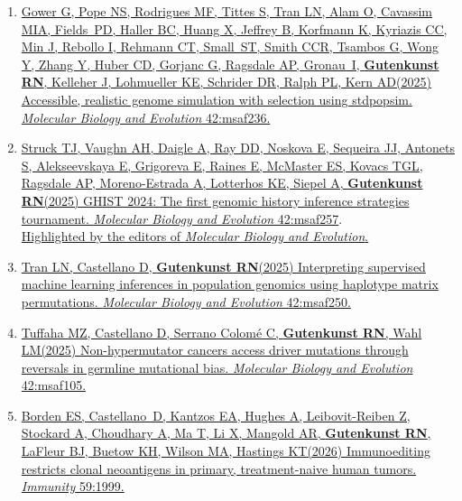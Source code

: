 \documentclass[11pt]{article}
\begin{document}
\begin{enumerate}
\item \href{https://doi.org/10.1093/molbev/msaf236}{Gower G\equal, Pope NS\equal, Rodrigues MF\equal, Tittes S\equal, Tran LN\trainee\equal, Alam O, Cavassim MIA, Fields~PD, Haller BC, Huang X\trainee, Jeffrey B, Korfmann K, Kyriazis CC, Min J, Rebollo I, Rehmann CT, Small~ST, Smith CCR, Tsambos G, Wong Y, Zhang Y, Huber CD, Gorjanc G, Ragsdale AP, Gronau~I, \textbf{Gutenkunst RN}, Kelleher J, Lohmueller KE, Schrider DR, Ralph PL, Kern AD\corresponding (2025) Accessible, realistic genome simulation with selection using stdpopsim. \emph{Molecular Biology and Evolution} 42:msaf236.}

\item \href{https://doi.org/10.1093/molbev/msaf257}{Struck TJ\trainee\equal, Vaughn AH\equal, Daigle A, Ray DD, Noskova E, Sequeira JJ, Antonets S, Alekseevskaya E, Grigoreva E, Raines E, McMaster ES, Kovacs TGL, Ragsdale AP, Moreno-Estrada A, Lotterhos KE, Siepel A, \textbf{Gutenkunst RN}\corresponding (2025) GHIST 2024: The first genomic history inference strategies tournament. \emph{Molecular Biology and Evolution} 42:msaf257}.\\
 \href{https://doi.org/10.1093/molbev/msaf278}{Highlighted by the editors of \emph{Molecular Biology and Evolution}.}

\item \href{https://doi.org/10.1093/molbev/msaf250}{Tran LN\trainee, Castellano D\trainee, \textbf{Gutenkunst RN}\corresponding (2025) Interpreting supervised machine learning inferences in population genomics using haplotype matrix permutations. \emph{Molecular Biology and Evolution} 42:msaf250.}

\item \href{https://doi.org/10.1093/molbev/msaf105}{Tuffaha MZ, Castellano D\trainee, Serrano Colom\'e C, \textbf{Gutenkunst RN}, Wahl LM\corresponding (2025) Non-hypermutator cancers access driver mutations through reversals in germline mutational bias. \emph{Molecular Biology and Evolution} 42:msaf105.}

\item \href{https://doi.org/10.1016/j.immuni.2026.05.005}{Borden ES, Castellano~D\trainee, Kantzos EA, Hughes A, Leibovit-Reiben Z, Stockard A, Choudhary A, Ma T, Li X, Mangold AR, \textbf{Gutenkunst RN}, LaFleur BJ, Buetow KH, Wilson MA, Hastings KT\corresponding (2026) Immunoediting restricts clonal neoantigens in primary, treatment-naive human tumors. \emph{Immunity} 59:1999.}

\end{enumerate}
\end{document}
